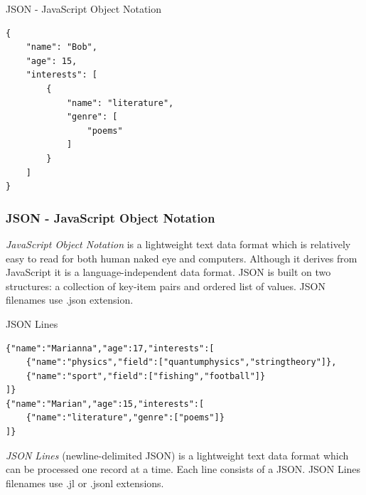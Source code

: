 \documentclass{beamer}
\begin{document}
\begin{frame}[fragile]{JSON - JavaScript Object Notation}
\begin{verbatim}
{
    "name": "Bob",
    "age": 15,
    "interests": [
        {
            "name": "literature",
            "genre": [
                "poems"
            ]
        }
    ]
}
\end{verbatim}
\end{frame}

\begin{frame}
    \frametitle{JSON - JavaScript Object Notation}
    \begin{definition}
        \emph{JavaScript Object Notation} is a lightweight text data format which is relatively easy to read for both human naked eye and computers. Although it derives from JavaScript it is a language-independent data format. JSON is built on two structures: a collection of key-item pairs and ordered list of values. JSON filenames use .json extension.
    \end{definition}
\end{frame}


\begin{frame}[fragile]{JSON Lines}
\begin{verbatim}
{"name":"Marianna","age":17,"interests":[
    {"name":"physics","field":["quantumphysics","stringtheory"]},
    {"name":"sport","field":["fishing","football"]}
]}
{"name":"Marian","age":15,"interests":[
    {"name":"literature","genre":["poems"]}
]}
\end{verbatim}
\begin{definition}
    \emph{JSON Lines} (newline-delimited JSON) is a lightweight text data format which can be processed one record at a time. Each line consists of a JSON. JSON Lines filenames use .jl or .jsonl extensions.
\end{definition}
\end{frame}
\end{document}

